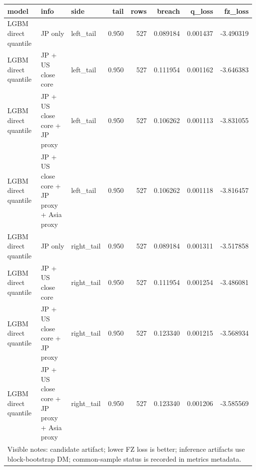 \begin{tabular}{lllrrrrr}
\toprule
model & info & side & tail & rows & breach & q_loss & fz_loss \\
\midrule
LGBM direct quantile & JP only & left\_tail & 0.950 & 527 & 0.089184 & 0.001437 & -3.490319 \\
LGBM direct quantile & JP + US close core & left\_tail & 0.950 & 527 & 0.111954 & 0.001162 & -3.646383 \\
LGBM direct quantile & JP + US close core + JP proxy & left\_tail & 0.950 & 527 & 0.106262 & 0.001113 & -3.831055 \\
LGBM direct quantile & JP + US close core + JP proxy + Asia proxy & left\_tail & 0.950 & 527 & 0.106262 & 0.001118 & -3.816457 \\
LGBM direct quantile & JP only & right\_tail & 0.950 & 527 & 0.089184 & 0.001311 & -3.517858 \\
LGBM direct quantile & JP + US close core & right\_tail & 0.950 & 527 & 0.111954 & 0.001254 & -3.486081 \\
LGBM direct quantile & JP + US close core + JP proxy & right\_tail & 0.950 & 527 & 0.123340 & 0.001215 & -3.568934 \\
LGBM direct quantile & JP + US close core + JP proxy + Asia proxy & right\_tail & 0.950 & 527 & 0.123340 & 0.001206 & -3.585569 \\
\midrule
\multicolumn{8}{l}{\footnotesize Visible notes: candidate artifact; lower FZ loss is better; inference artifacts use block-bootstrap DM; common-sample status is recorded in metrics metadata.} \\
\bottomrule
\end{tabular}
